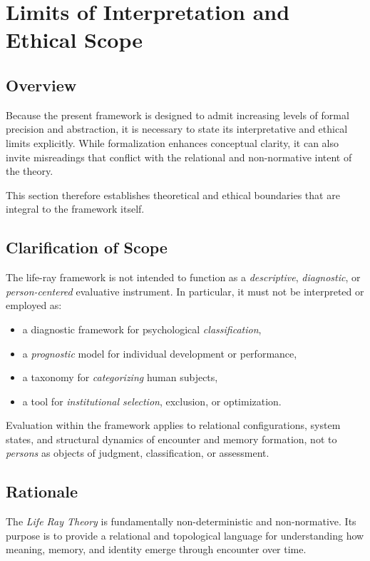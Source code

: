 \section{Limits of Interpretation and Ethical Scope}

\subsection{Overview}

Because the present framework is designed to admit increasing levels of formal precision and abstraction,
it is necessary to state its interpretative and ethical limits explicitly.
While formalization enhances conceptual clarity,
it can also invite misreadings that conflict with the relational and non-normative intent of the theory.

This section therefore establishes theoretical and ethical boundaries that are integral to the framework itself.

\subsection{Clarification of Scope}

The life-ray framework is not intended to function as a \textit{descriptive}, \textit{diagnostic}, or \textit{person-centered} evaluative instrument.
In particular, it must not be interpreted or employed as:

\begin{itemize}
    \item a diagnostic framework for psychological \textit{classification},
    \item a \textit{prognostic} model for individual development or performance,
    \item a taxonomy for \textit{categorizing} human subjects,
    \item a tool for \textit{institutional selection}, exclusion, or optimization.
\end{itemize}

Evaluation within the framework applies to relational configurations,
system states, and structural dynamics of encounter and memory formation,
not to \textit{persons} as objects of judgment, classification, or assessment.

\subsection{Rationale}

The \emph{Life Ray Theory} is fundamentally non-deterministic and non-normative.
Its purpose is to provide a relational and topological language for understanding how meaning,
memory, and identity emerge through encounter over time.

